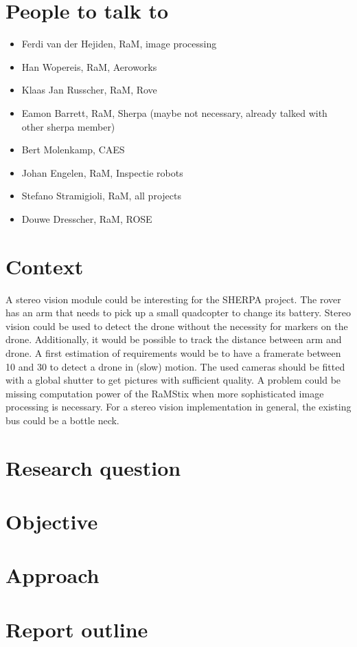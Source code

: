 \section{People to talk to}
\begin{itemize}	
	\item Ferdi van der Hejiden, RaM, image processing
	\item Han Wopereis, RaM, Aeroworks
	\item Klaas Jan Russcher, RaM, Rove
	\item Eamon Barrett, RaM, Sherpa (maybe not necessary, already talked with other sherpa member)
	\item Bert Molenkamp, CAES
	\item Johan Engelen, RaM, Inspectie robots
	\item Stefano Stramigioli, RaM, all projects
	\item Douwe Dresscher, RaM, ROSE
\end{itemize}

\section{Context}
A stereo vision module could be interesting for the SHERPA project. The rover has an arm that needs to pick up a small quadcopter
to change its battery. Stereo vision could be used to detect the drone without the necessity for markers on the drone. Additionally, 
it would be possible to track the distance between arm and drone. A first estimation of requirements would be to have a framerate 
between 10 and 30 to detect a drone in (slow) motion. The used cameras should be fitted with a global shutter to get pictures with sufficient quality. A problem could be missing computation power of the RaMStix when more sophisticated image processing is necessary. For a stereo vision implementation in general, the existing bus could be a bottle neck. 

\section{Research question}
\section{Objective}

\section{Approach}

\section{Report outline}

